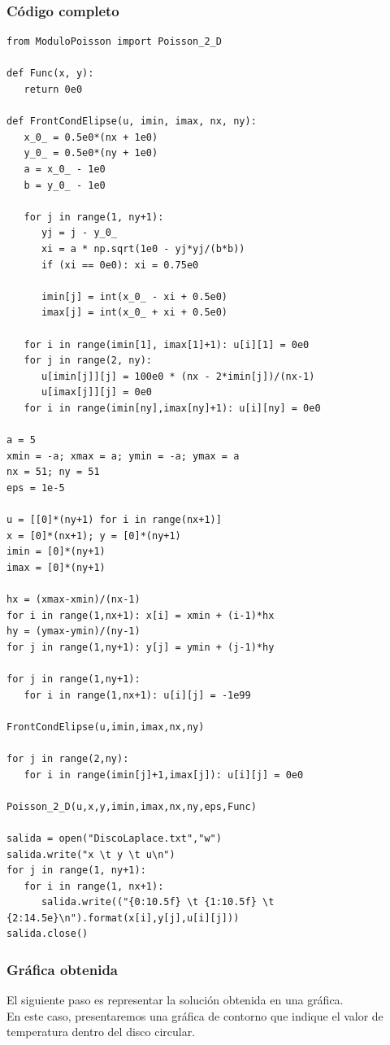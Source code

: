 \begin{frame}
\frametitle{Código completo}
\begin{lstlisting}[caption=Código para el ejercicio con dominio irregular, style=FormattedNumber, basicstyle=\linespread{1.1}\ttfamily=\small, columns=fullflexible]
from ModuloPoisson import Poisson_2_D

def Func(x, y):
   return 0e0

def FrontCondElipse(u, imin, imax, nx, ny):
   x_0_ = 0.5e0*(nx + 1e0)
   y_0_ = 0.5e0*(ny + 1e0)
   a = x_0_ - 1e0
   b = y_0_ - 1e0

   for j in range(1, ny+1):
      yj = j - y_0_
      xi = a * np.sqrt(1e0 - yj*yj/(b*b))
      if (xi == 0e0): xi = 0.75e0

      imin[j] = int(x_0_ - xi + 0.5e0)
      imax[j] = int(x_0_ + xi + 0.5e0)

   for i in range(imin[1], imax[1]+1): u[i][1] = 0e0
   for j in range(2, ny):
      u[imin[j]][j] = 100e0 * (nx - 2*imin[j])/(nx-1)
      u[imax[j]][j] = 0e0
   for i in range(imin[ny],imax[ny]+1): u[i][ny] = 0e0

a = 5
xmin = -a; xmax = a; ymin = -a; ymax = a
nx = 51; ny = 51
eps = 1e-5

u = [[0]*(ny+1) for i in range(nx+1)]
x = [0]*(nx+1); y = [0]*(ny+1)
imin = [0]*(ny+1)
imax = [0]*(ny+1)

hx = (xmax-xmin)/(nx-1)
for i in range(1,nx+1): x[i] = xmin + (i-1)*hx
hy = (ymax-ymin)/(ny-1)
for j in range(1,ny+1): y[j] = ymin + (j-1)*hy

for j in range(1,ny+1):
   for i in range(1,nx+1): u[i][j] = -1e99

FrontCondElipse(u,imin,imax,nx,ny)

for j in range(2,ny):
   for i in range(imin[j]+1,imax[j]): u[i][j] = 0e0

Poisson_2_D(u,x,y,imin,imax,nx,ny,eps,Func)

salida = open("DiscoLaplace.txt","w")
salida.write("x \t y \t u\n")
for j in range(1, ny+1):
   for i in range(1, nx+1):
      salida.write(("{0:10.5f} \t {1:10.5f} \t {2:14.5e}\n").format(x[i],y[j],u[i][j]))
salida.close()
\end{lstlisting}
\end{frame}
\begin{frame}
\frametitle{Gráfica obtenida}
El siguiente paso es representar la solución obtenida en una gráfica.
\\
\bigskip
En este caso, presentaremos una gráfica de contorno que indique el valor de temperatura dentro del disco circular.
\end{frame}
